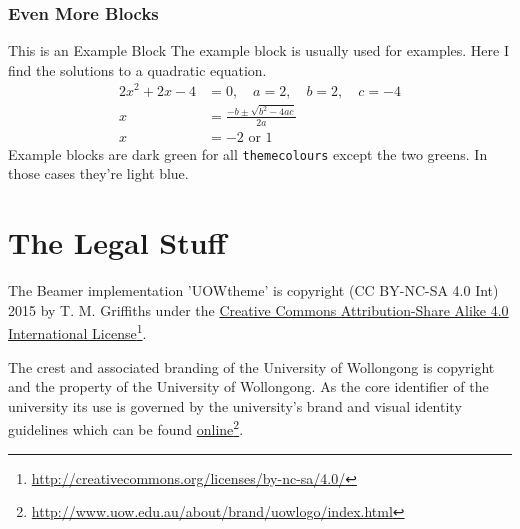 \documentclass[aspectratio=169]{beamer}
\begin{document}
\begin{frame}
\frametitle{Even More Blocks}
\begin{exampleblock}{This is an Example Block}
The example block is usually used for examples. Here I find the solutions to a quadratic equation.
\begin{align*}
   2x^2 + 2x - 4 & = 0, \quad a=2, \quad b =2, \quad c=-4\\
   x & =\frac{-b\pm\sqrt{b^2-4ac}}{2a} \\
   x & =-2 \text{ or } 1
\end{align*}
Example blocks are dark green for all \texttt{themecolours} except the two greens. In those cases they're light blue.
\end{exampleblock}
\end{frame}


\section{The Legal Stuff}


\begin{frame}
The Beamer implementation 'UOWtheme' is copyright (CC BY-NC-SA 4.0 Int) 2015 by T. M. Griffiths under the \href{http://creativecommons.org/licenses/by-sa/4.0/}{Creative Commons Attribution-Share Alike 4.0 International License}\footnote{\url{http://creativecommons.org/licenses/by-nc-sa/4.0/}}.

\begin{center}\color{UOWdarkred}\ccbysa\end{center}

The crest and associated branding of the University of Wollongong is copyright and the property of the University of Wollongong. As the core identifier of the university its use is governed by the university's brand and visual identity guidelines which can be found \href{http://www.uow.edu.au/about/brand/uowlogo/index.html}{online}\footnote{\url{http://www.uow.edu.au/about/brand/uowlogo/index.html}}.

\end{frame}
\end{document}
